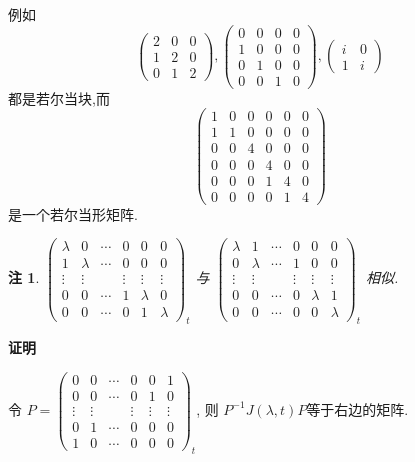\documentclass[13pt]{beamer}
\newtheorem*{rem}{注}
\def\pf{{\bf 证明~~ }}
\begin{document}
\begin{frame}
例如
\[
\left(\begin{array}{lll}
2 & 0 & 0 \\
1 & 2 & 0 \\
0 & 1 & 2
\end{array}\right),
\left(\begin{array}{cccc}
0 & 0 & 0 & 0 \\
1 & 0 & 0 & 0 \\
0 & 1 & 0 & 0 \\
0 & 0 & 1 & 0
\end{array}\right),
\left(\begin{array}{cc}
i & 0 \\
1 & i
\end{array}\right)
\]
都是若尔当块,而
\[
\left(\begin{array}{cccccc}
1 & 0 & 0 & 0 & 0 & 0 \\
1 & 1 & 0 & 0 & 0 & 0 \\
0 & 0 & 4 & 0 & 0 & 0 \\
0 & 0 & 0 & 4 & 0 & 0 \\
0 & 0 & 0 & 1 & 4 & 0 \\
0 & 0 & 0 & 0 & 1 & 4
\end{array}\right)
\]
是一个若尔当形矩阵.
\end{frame}

\begin{frame}
\begin{rem}
	$
	\left(\begin{array}{cccccc}
	\lambda & 0 & \cdots & 0 & 0 & 0 \\
	1 & \lambda & \cdots & 0 & 0 & 0 \\
	\vdots & \vdots & & \vdots & \vdots & \vdots \\
	0 & 0 & \cdots & 1 & \lambda & 0 \\
	0 & 0 & \cdots & 0 & 1 & \lambda
	\end{array}\right)_{t}
	$
	与
	$
	\left(\begin{array}{cccccc}
	\lambda & 1 & \cdots & 0 & 0 & 0 \\
	0 & \lambda & \cdots & 1 & 0 & 0 \\
	\vdots & \vdots & & \vdots & \vdots & \vdots \\
	0 & 0 & \cdots & 0 & \lambda & 1 \\
	0 & 0 & \cdots & 0 & 0 & \lambda
	\end{array}\right)_{t}
	$
	相似.	
\end{rem}
\pf 

令
$P=
\left(\begin{array}{cccccc}
0 & 0 & \cdots & 0 & 0 & 1 \\
0 & 0 & \cdots & 0 & 1 & 0 \\
\vdots & \vdots & & \vdots & \vdots & \vdots \\
0 & 1 & \cdots & 0 & 0 & 0 \\
1 & 0 & \cdots & 0 & 0 & 0
\end{array}\right)_{t}
$, 则 $P^{-1}{J}(\lambda, t)P$等于右边的矩阵.
\end{frame}
\end{document}
